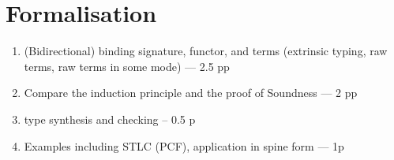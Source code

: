 \documentclass[BiSig.tex]{subfiles}
\begin{document}
\section{Formalisation} \label{sec:formalisation}
\begin{enumerate}
  \item (Bidirectional) binding signature, functor, and terms (extrinsic typing, raw terms, raw terms in some mode) --- 2.5 pp
  \item Compare the induction principle and the \Agda proof of Soundness --- 2 pp
  \item type synthesis and checking -- 0.5 p
  \item Examples including STLC (PCF), application in spine form --- 1p

\end{enumerate}
\end{document}
